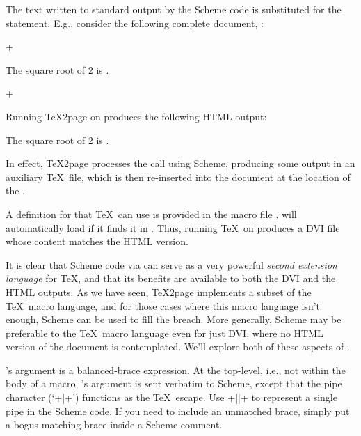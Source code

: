 {{{{{{{{{{{{{{The text written
to standard output by the Scheme code is substituted
for the \p{\eval} statement.  E.g., consider the
following complete document, :

\p+


The square root of 2 is
.

\bye
+

\n Running \TeX2page on  produces
the following HTML output:

\quote
\n The square root of 2 is
.
\endquote

\n In effect, \TeX2page processes the \p{\eval} call
using Scheme, producing some output in an auxiliary
\TeX\ file, which is then re-inserted into the document at the location of
the \p{\eval}.

A definition for \p{\eval} that \TeX\ can use
is provided in the macro file .
 will automatically load  if it finds it in
.
Thus, running \TeX\ on
 produces a DVI file whose
content matches the HTML version.


It is clear that Scheme code via \p{\eval} can serve as
a very powerful {\em second extension language} for
\TeX, and that its benefits are available to both the
DVI and the HTML outputs.  As we have seen, \TeX2page
implements a subset of the \TeX\ macro language, and for
those cases where this macro language isn't enough,
Scheme can be used to fill the breach.  More generally,
Scheme may be preferable to the \TeX\ macro language even
for just DVI, where no HTML version of the document is
contemplated.  We'll explore both of these
aspects of \p{\eval}.

\p{\eval}'s argument is a balanced-brace
expression.  At the top-level, i.e., not within the body of a macro,
\p{\eval}'s argument is sent verbatim to Scheme, except that the pipe character
(`\p+|+') functions as the \TeX\ escape.  Use \p+||+ to represent a single
pipe in the Scheme code.  If you need to include an unmatched brace, simply
put a bogus matching brace inside a Scheme comment.

}}}}}}}}}}}}}}
